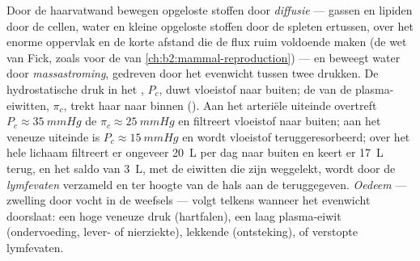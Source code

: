 \begin{proposition}\label{prop:b2:blood-circulation:exchange}
Door de haarvatwand bewegen opgeloste stoffen door \emph{diffusie} ---
gassen en lipiden door de cellen, water en kleine opgeloste stoffen door de
spleten ertussen, over het enorme oppervlak en de korte afstand die de flux
ruim voldoende maken (de wet van Fick, zoals voor de  van
\cref{ch:b2:mammal-reproduction}) --- en beweegt water door
\emph{massastroming}, gedreven door het evenwicht tussen twee drukken. De
hydrostatische druk in het , $P_c$, duwt vloeistof naar buiten; de
 van de plasma-eiwitten, $\pi_c$, trekt haar naar binnen
(\emph{}). Aan het arteriële uiteinde overtreft
$P_c \approx
\qty{35}{mmHg}$ de $\pi_c \approx \qty{25}{mmHg}$ en filtreert vloeistof
naar buiten; aan het veneuze uiteinde is $P_c \approx \qty{15}{mmHg}$ en
wordt vloeistof teruggeresorbeerd; over het hele lichaam filtreert er
ongeveer \qty{20}{L} per dag naar buiten en keert er \qty{17}{L} terug, en het
saldo van \qty{3}{L}, met de eiwitten die zijn weggelekt, wordt door de
\emph{lymfevaten} verzameld en ter hoogte van de hals aan de 
teruggegeven. \emph{Oedeem} --- zwelling door vocht in de weefsels ---
volgt telkens wanneer het evenwicht doorslaat: een hoge veneuze druk
(hartfalen), een laag plasma-eiwit (ondervoeding, lever- of nierziekte),
lekkende  (ontsteking), of verstopte lymfevaten.
\end{proposition}

